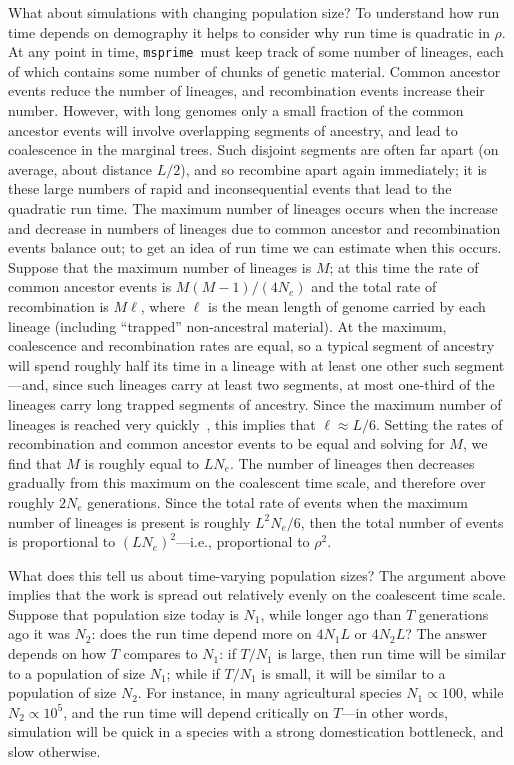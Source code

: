\documentclass{article}
\newcommand{\msprime}[0]{\texttt{msprime}}
\begin{document}
What about simulations with changing population size?
To understand how run time depends on demography
it helps to consider why run time is quadratic in $\rho$.
At any point in time, \msprime\ must keep track of some number of lineages,
each of which contains some number of chunks of genetic material.
Common ancestor events reduce the number of lineages,
and recombination events increase their number.
However, with long genomes
only a small fraction of the common ancestor events
will involve overlapping segments of ancestry,
and lead to coalescence in the marginal trees.
Such disjoint segments are often far apart (on average, about distance $L/2$),
and so recombine apart again immediately;
it is these large numbers of rapid and inconsequential events that
lead to the quadratic run time.
The maximum number of lineages occurs when
the increase and decrease in numbers of lineages due to
common ancestor and recombination events balance out;
to get an idea of run time we can estimate when this occurs.
Suppose that the maximum number of lineages is $M$;
at this time the rate of common ancestor events is $M (M-1) / (4 N_e)$
and the total rate of recombination is $M \ell$,
where $\ell$ is the mean length of genome carried by each lineage
(including ``trapped'' non-ancestral material).
At the maximum, coalescence and recombination rates are equal,
so a typical segment of ancestry will spend roughly half its time
in a lineage with at least one other such segment---and,
since such lineages carry at least two segments,
at most one-third of the lineages carry long trapped segments of ancestry.
Since the maximum number of lineages is reached
very quickly~\citep{nelson2020accounting},
this implies that $\ell \approx L / 6$.
Setting the rates of recombination and common ancestor events
to be equal and solving for $M$,
we find that $M$ is roughly equal to $L N_e$.
The number of lineages then decreases gradually from this maximum
on the coalescent time scale, and therefore over roughly $2 N_e$ generations.
Since the total rate of events when the maximum number of lineages is
present is roughly $L^2 N_e / 6$,
then the total number of events is proportional to $(L N_e)^2$---i.e.,
proportional to $\rho^2$.

What does this tell us about time-varying population sizes?
The argument above implies that the work is spread out relatively
evenly on the coalescent time scale.
Suppose that population size today is $N_1$,
while longer ago than $T$ generations ago it was $N_2$:
does the run time depend more on $4 N_1 L$ or $4 N_2 L$?
The answer depends on how $T$ compares to $N_1$: if $T/N_1$ is large,
then run time will be similar to a population of size $N_1$;
while if $T/N_1$ is small, it will be similar to a population of size $N_2$.
For instance, in many agricultural species $N_1 \propto 100$, while $N_2 \propto 10^5$,
and the run time will depend critically on $T$---in other words,
simulation will be quick in a species with a strong domestication bottleneck,
and slow otherwise.
\end{document}
